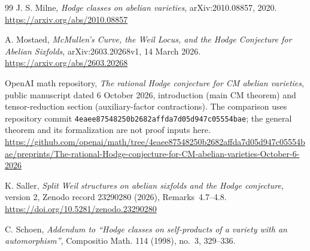 \begin{thebibliography}{99}
J. S. Milne,
\emph{Hodge classes on abelian varieties},
arXiv:2010.08857, 2020.
\url{https://arxiv.org/abs/2010.08857}

A. Mostaed,
\emph{McMullen's Curve, the Weil Locus, and the Hodge Conjecture for Abelian Sixfolds},
arXiv:2603.20268v1, 14 March 2026.
\url{https://arxiv.org/abs/2603.20268}

OpenAI math repository,
\emph{The rational Hodge conjecture for CM abelian varieties},
public manuscript dated 6 October 2026, introduction (main CM theorem)
and tensor-reduction section (auxiliary-factor contractions).
The comparison uses repository commit
\texttt{4eaee87548250b2682affda7d05d947c05554bae};
the general theorem and its formalization are not proof inputs here.
\url{https://github.com/openai/math/tree/4eaee87548250b2682affda7d05d947c05554bae/preprints/The-rational-Hodge-conjecture-for-CM-abelian-varieties-October-6-2026}

K. Saller,
\emph{Split Weil structures on abelian sixfolds and the Hodge conjecture},
version 2, Zenodo record 23290280 (2026), Remarks~4.7--4.8.
\url{https://doi.org/10.5281/zenodo.23290280}

C. Schoen,
\emph{Addendum to ``Hodge classes on self-products of a variety with an automorphism''},
Compositio Math. 114 (1998), no.~3, 329--336.

\end{thebibliography}
